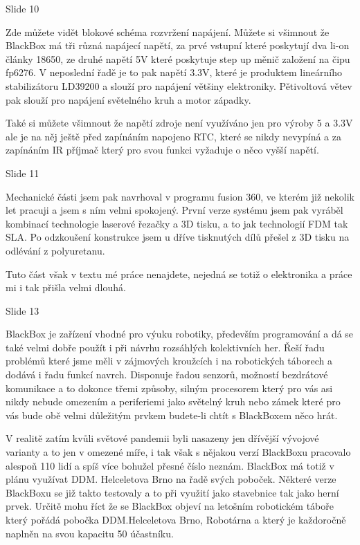 
Slide 10

Zde můžete vidět blokové schéma rozvržení napájení.
Můžete si všimnout že BlackBox má tři různá napájecí napětí, za prvé vstupní které poskytují dva li-on články 18650, 
ze druhé napětí 5V které poskytuje step up měnič založení na čipu fp6276. V neposlední řadě je to pak napětí 3.3V,
které je produktem lineárního stabilizátoru LD39200 a slouží pro napájení většiny elektroniky.
Pětivoltová větev pak slouží pro napájení světelného kruh a motor západky.

Také si můžete všimnout že napětí zdroje není využíváno jen pro výroby 5 a 3.3V ale je na něj ještě před zapínáním 
napojeno RTC, které se nikdy nevypíná a za zapínáním IR příjmač který pro svou funkci vyžaduje o něco vyšší napětí.


Slide 11


Mechanické části jsem pak navrhoval v programu fusion 360, ve kterém již nekolik let pracuji a jsem s ním velmi spokojený.
První verze systému jsem pak vyráběl kombinací technologie laserové řezačky a 3D tisku, a to jak technologií FDM tak SLA.
Po odzkoušení konstrukce jsem u dříve tisknutých dílů přešel z 3D tisku na odlévání z polyuretanu. 

Tuto část však v textu mé práce nenajdete, nejedná se totiž o elektronika a práce mi i tak přišla velmi dlouhá.


Slide 13

 
BlackBox je zařízení vhodné pro výuku robotiky, především programování a dá se také velmi dobře použít i při návrhu rozsáhlých 
kolektivních her. Řeší řadu problémů které jsme měli v zájmových kroužcích i na robotických táborech a dodává i řadu funkcí navrch.
Disponuje řadou senzorů, možností bezdrátové komunikace a to dokonce třemi způsoby, silným procesorem který pro vás asi nikdy nebude omezením
a periferiemi jako světelný kruh nebo zámek které pro vás bude obě velmi důležitým prvkem budete-li chtít s BlackBoxem něco hrát.

V realitě zatím kvůli světové pandemii byli nasazeny jen dřívější vývojové varianty a to jen v omezené míře, i tak však s nějakou verzí BlackBoxu 
pracovalo alespoň 110 lidí a spíš více bohužel přesné číslo neznám. BlackBox má totiž v plánu využívat DDM. Helceletova Brno na řadě svých poboček.
Některé verze BlackBoxu se již takto testovaly a to při využití jako stavebnice tak jako herní prvek. Určitě mohu říct že se BlackBox objeví 
na letošním robotickém táboře který pořádá pobočka DDM.Helceletova Brno, Robotárna a který je každoročně naplněn na svou kapacitu 50 účastníku. %

